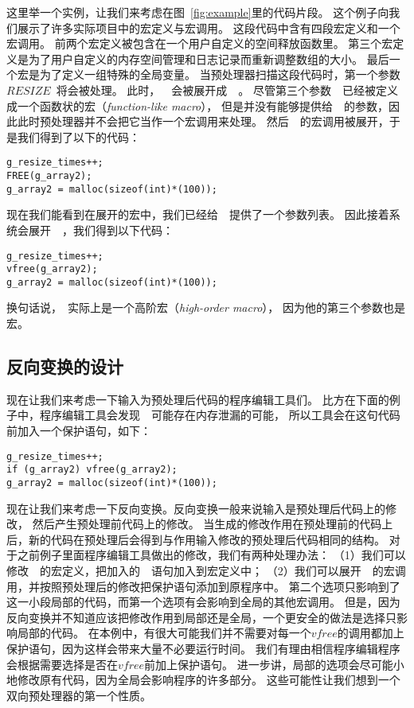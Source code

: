 这里举一个实例，让我们来考虑在图~\ref{fig:example}里的代码片段。
这个例子向我们展示了许多实际项目中的宏定义与宏调用。
这段代码中含有四段宏定义和一个宏调用。
前两个宏定义被包含在一个用户自定义的空间释放函数里。
第三个宏定义是为了用户自定义的内存空间管理和日志记录而重新调整数组的大小。
最后一个宏是为了定义一组特殊的全局变量。
当预处理器扫描这段代码时，第一个参数~$RESIZE$~将会被处理。
此时，~~会被展开成~~。
尽管第三个参数~~已经被定义成一个函数状的宏（\emph{function-like macro}），
但是并没有能够提供给~~的参数，因此此时预处理器并不会把它当作一个宏调用来处理。
然后~~的宏调用被展开，于是我们得到了以下的代码：
\begin{lstlisting}
g_resize_times++;
FREE(g_array2);
g_array2 = malloc(sizeof(int)*(100));
\end{lstlisting}
现在我们能看到在展开的宏中，我们已经给~~提供了一个参数列表。
因此接着系统会展开~~，我们得到以下代码：
\begin{lstlisting}
g_resize_times++;
vfree(g_array2);
g_array2 = malloc(sizeof(int)*(100));
\end{lstlisting}
换句话说，~实际上是一个高阶宏（\emph{high-order macro}），
因为他的第三个参数也是宏。

\subsection{反向变换的设计}
现在让我们来考虑一下输入为预处理后代码的程序编辑工具们。
比方在下面的例子中，程序编辑工具会发现~~可能存在内存泄漏的可能，
所以工具会在这句代码前加入一个保护语句，如下：
\begin{lstlisting}
g_resize_times++;
if (g_array2) vfree(g_array2);
g_array2 = malloc(sizeof(int)*(100));
\end{lstlisting}

现在让我们来考虑一下反向变换。反向变换一般来说输入是预处理后代码上的修改，
然后产生预处理前代码上的修改。
当生成的修改作用在预处理前的代码上后，新的代码在预处理后会得到与作用输入修改的预处理后代码相同的结构。
对于之前例子里面程序编辑工具做出的修改，我们有两种处理办法：
（1）我们可以修改~~的宏定义，把加入的~~语句加入到宏定义中；
（2）我们可以展开~~的宏调用，并按照预处理后的修改把保护语句添加到原程序中。
第二个选项只影响到了这一小段局部的代码，而第一个选项有会影响到全局的其他宏调用。
但是，因为反向变换并不知道应该把修改作用到局部还是全局，一个更安全的做法是选择只影响局部的代码。
在本例中，有很大可能我们并不需要对每一个$vfree$的调用都加上保护语句，因为这样会带来大量不必要运行时间。
我们有理由相信程序编辑程序会根据需要选择是否在$vfree$前加上保护语句。
进一步讲，局部的选项会尽可能小地修改原有代码，因为全局会影响程序的许多部分。
这些可能性让我们想到一个双向预处理器的第一个性质。

